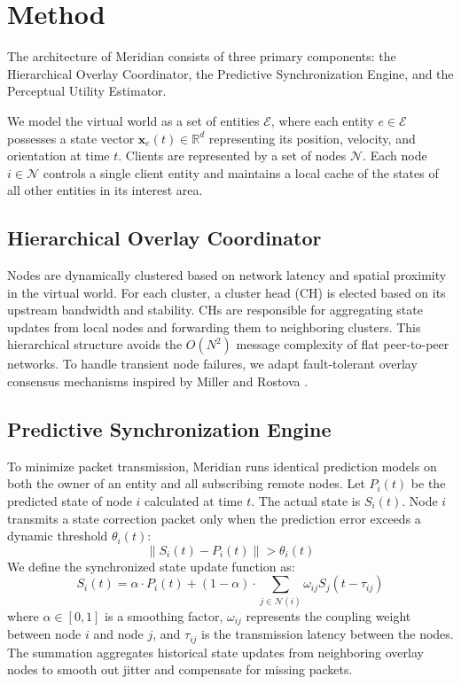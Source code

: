 \section{Method}
The architecture of Meridian consists of three primary components: the Hierarchical Overlay Coordinator, the Predictive Synchronization Engine, and the Perceptual Utility Estimator. 

We model the virtual world as a set of entities $\mathcal{E}$, where each entity $e \in \mathcal{E}$ possesses a state vector $\mathbf{x}_e(t) \in \mathbb{R}^d$ representing its position, velocity, and orientation at time $t$. Clients are represented by a set of nodes $\mathcal{N}$. Each node $i \in \mathcal{N}$ controls a single client entity and maintains a local cache of the states of all other entities in its interest area.

\subsection{Hierarchical Overlay Coordinator}
Nodes are dynamically clustered based on network latency and spatial proximity in the virtual world. For each cluster, a cluster head (CH) is elected based on its upstream bandwidth and stability. CHs are responsible for aggregating state updates from local nodes and forwarding them to neighboring clusters. This hierarchical structure avoids the $O(N^2)$ message complexity of flat peer-to-peer networks. To handle transient node failures, we adapt fault-tolerant overlay consensus mechanisms inspired by Miller and Rostova \cite{miller2023fault}.

\subsection{Predictive Synchronization Engine}
To minimize packet transmission, Meridian runs identical prediction models on both the owner of an entity and all subscribing remote nodes. Let $P_i(t)$ be the predicted state of node $i$ calculated at time $t$. The actual state is $S_i(t)$. Node $i$ transmits a state correction packet only when the prediction error exceeds a dynamic threshold $\theta_i(t)$:
\[
  \|S_i(t) - P_i(t)\| > \theta_i(t)
\]
We define the synchronized state update function as:
\begin{equation}
  S_i(t) = \alpha \cdot P_i(t) + (1 - \alpha) \cdot \sum_{j \in \mathcal{N}(i)} \omega_{ij} S_j(t - \tau_{ij})
  \label{eq:state_sync}
\end{equation}
where $\alpha \in [0,1]$ is a smoothing factor, $\omega_{ij}$ represents the coupling weight between node $i$ and node $j$, and $\tau_{ij}$ is the transmission latency between the nodes. The summation aggregates historical state updates from neighboring overlay nodes to smooth out jitter and compensate for missing packets.

